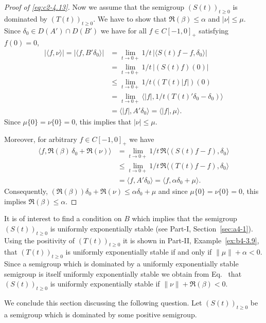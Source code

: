 \begin{example}
\begin{proof}[Proof of \eqref{eq:c2-4.13}]
Now we assume that the semigroup $(S(t))_{t \geq 0}$ is dominated by $(T(t))_{t \geq 0}$.
We have to show that $\Re(\beta) \leq \alpha$ and $|\nu| \leq \mu$.
Since $\delta_{0} \in D(A') \cap D(B')$ we have for all $f \in C[-1,0]_{+}$ satisfying $f(0) = 0$,
\begin{align*}
|\langle f,\nu\rangle| = |\langle f,B'\delta_{0}\rangle| &= \lim_{t \to 0+} 1/t \, |\langle S(t)f - f , \delta_{0}\rangle|\\
%
&= \lim_{t \to 0+} 1/t \, |(S(t)f)(0)|  \\
&\leq \lim_{t \to 0+} 1/t \, ((T(t)|f|)(0) \\
&= \lim_{t \to 0+} \langle|f|,1/t(T(t)'\delta_{0} - \delta_{0})\rangle \\
&= \langle|f|,A'\delta_{0}\rangle = \langle|f|,\mu\rangle.
\end{align*}
Since $\mu\{0\} = \nu\{0\} = 0$, this implies that $|\nu| \leq \mu$.

Moreover, for arbitrary $f \in C[-1,0]_{+}$ we have
\begin{align*}
\langle f,\Re(\beta) \, \delta_{0} + \Re(\nu)\rangle &= \lim_{t \to 0+} 1/t \, \Re\langle(S(t)f - f),\delta_{0}\rangle\\
&\leq \lim_{t \to 0+} 1/t \, \Re\langle(T(t)f - f),\delta_{0}\rangle \\
&= \langle f,A'\delta_{0}\rangle = \langle f,\alpha\delta_{0} + \mu\rangle.
\end{align*}
Consequently, $(\Re(\beta))\delta_{0} + \Re(\nu) \leq \alpha\delta_{0} + \mu$ and since $\mu \{0\}  = \nu\{0\}  = 0$, this implies $\Re(\beta) \leq \alpha$. 
\end{proof}
\end{example}
\begin{remark*}
It is of interest to find a condition on $B$ which implies that the semigroup $(S(t))_{t \geq 0}$ is uniformly exponentially stable (see Part-I, Section~\ref{sec:a4-1}).
Using the positivity of\/ $(T(t))_{t \geq 0}$ it is shown in Part-II, Example~\ref{ex:b4-3.9}, that
$(T(t))_{t \geq 0}$ is uniformly exponentially stable if and only if\/ $\|\mu\| + \alpha < 0$.
Since a semigroup which is dominated by a uniformly exponentially stable semigroup is itself uniformly exponentially stable we obtain from Eq.~ that $(S(t))_{t \geq 0}$ is uniformly exponentially stable if\/ $\|\nu\| + \Re(\beta) < 0$.
\end{remark*}
We conclude this section discussing the following question.
Let $(S(t))_{t \geq 0}$ be a semigroup which is dominated by some positive semigroup.
